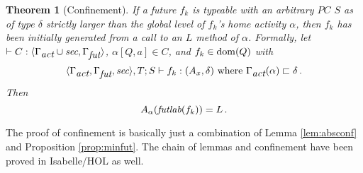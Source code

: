 \documentclass[10pt, conference, compsocconf]{IEEEtran}
\newcommand{\symb}[1]{\makebox{\it #1}}
\newcommand\dom{{\rm dom}}
\newtheorem{theorem}{Theorem}
\begin{document}
{\begin{theorem}[Confinement]
\label{thm:conf}
If a future $f_k$ is typeable with an arbitrary $PC$ $S$ as of type $\delta$ strictly larger than
the global level of $f_k$'s home activity $\alpha$, then $f_k$ has been initially generated from a call
to an $L$ method of $\alpha$.
Formally, 
let $\vdash C: \langle \Gamma_{\symb{act}} \cup \symb{sec}, \Gamma_{\symb{fut}}\rangle$, $\alpha[Q,a] \in C$, 
and $f_k \in \dom(Q)$ with
\[\langle \Gamma_{\symb{act}}, \Gamma_{\symb{fut}}, \symb{sec} \rangle, T; S \vdash f_k: (A_x,\delta)
\ {\rm where}\ \Gamma_{\symb{act}}(\alpha) \sqsubset \delta \,.\] 
Then 
\[A_\alpha(\symb{futlab}(f_k)) = L\,.\]
\end{theorem}

The proof of confinement is basically just a combination of Lemma \ref{lem:absconf}
and Proposition \ref{prop:minfut}. The chain of lemmas and confinement have been proved in Isabelle/HOL
as well.

}
\end{document}
